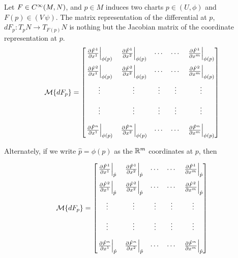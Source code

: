 \documentclass[../main-manifolds.tex]{subfiles}
\begin{document}
\begin{definition}
Let $F\in \cinf[M,N]$, and $p\in M$ induces two charts $p\in (U,\phi)$ and $F(p)\in(V\,\psi)$. The matrix representation of the differential at $p$, $dF_p: T_p N\to T_{F(p)}N$ is nothing but the Jacobian matrix of the coordinate representation at $p$.
\begin{equation}\label{lee-chap3:jacobian-matrix-representation}
        \mcal\{dF_p\} = \begin{bmatrix}\eval{\pdv{\hat{F}^1}{x^1}}_{\phi(p)} & \eval{\pdv{\hat{F}^1}{x^2}}_{\phi(p)} & \cdots & \cdots & \eval{\pdv{\hat{F}^1}{x^m}}_{\phi(p)} \\[1em] \eval{\pdv{\hat{F}^2}{x^1}}_{\phi(p)} & \eval{\pdv{\hat{F}^2}{x^2}}_{\phi(p)} & \cdots & \cdots & \eval{\pdv{\hat{F}^2}{x^m}}_{\phi(p)} \\[1em] \vdots & \vdots & \vdots & \vdots & \vdots \\[1em] \vdots & \vdots & \vdots & \vdots & \vdots \\[1em] \eval{\pdv{\hat{F}^n}{x^1}}_{\phi(p)} & \eval{\pdv{\hat{F}^n}{x^2}}_{\phi(p)} & \cdots & \cdots & \eval{\pdv{\hat{F}^n}{x^m}}_{\phi(p)}\end{bmatrix}
\end{equation}

Alternately, if we write $\hat{p} = \phi(p)$ as the ${\mathbb{R}^m}$ coordinates at $p$, then

\begin{equation}\label{lee-chap3:jacobian-matrix-representation-alternate}
        \mcal\{dF_p\} = \begin{bmatrix}\eval{\pdv{\hat{F}^1}{x^1}}_{\hat{p}} & \eval{\pdv{\hat{F}^1}{x^2}}_{\hat{p}} & \cdots & \cdots & \eval{\pdv{\hat{F}^1}{x^m}}_{\hat{p}} \\[1em] \eval{\pdv{\hat{F}^2}{x^1}}_{\hat{p}} & \eval{\pdv{\hat{F}^2}{x^2}}_{\hat{p}} & \cdots & \cdots & \eval{\pdv{\hat{F}^2}{x^m}}_{\hat{p}} \\[1em] \vdots & \vdots & \vdots & \vdots & \vdots \\[1em] \vdots & \vdots & \vdots & \vdots & \vdots \\[1em] \eval{\pdv{\hat{F}^n}{x^1}}_{\hat{p}} & \eval{\pdv{\hat{F}^n}{x^2}}_{\hat{p}} & \cdots & \cdots & \eval{\pdv{\hat{F}^n}{x^m}}_{\hat{p}}\end{bmatrix}
\end{equation}
\end{definition}
\end{document}

